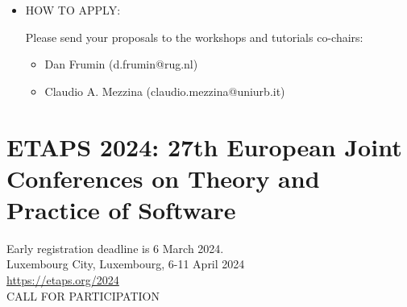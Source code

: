 \documentclass[prodmode,acmtecs]{acmsmall} %
\begin{document}
\begin{itemize}
\begin{tabulary}{\linewidth}{LL}Proposal submission:  & Feb 12, 2024 \\
Notification of accepted satellite events:  & Mar 01, 2024 \\
\end{tabulary}
 
  but we would like to hear about prospective proposals as soon as possible.  
 
\item  HOW TO APPLY: 
 
  Please send your proposals to the workshops and tutorials co-chairs: 
 
\begin{itemize}\item  Dan Frumin (d.frumin@rug.nl)
\item  Claudio A. Mezzina (claudio.mezzina@uniurb.it)
\end{itemize} 
\end{itemize}\section{ETAPS 2024: 27th European Joint Conferences on Theory and Practice of Software}\label{ETAPS2024}  Early registration deadline is 6 March 2024.\\ 
  Luxembourg City, Luxembourg, 6-11 April 2024\\ 
  \href{https://etaps.org/2024}{https://etaps.org/2024}\\ 
CALL FOR PARTICIPATION 
\end{document}
